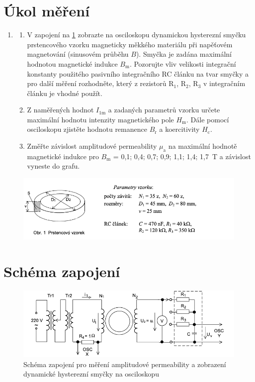 \documentclass[a4paper,12pt]{article}   %
\newcommand{\tsub}[1]{$_\textrm{#1}$}
\begin{document}
\section{Úkol měření}
\label{chap:ukol}
\begin{enumerate}
    \item 
    \begin{enumerate}[label=\alph*)]
        \item V zapojení na \ref{fig:schema} zobrazte na osciloskopu dynamickou hysterezní smyčku prstencového vzorku magneticky měkkého materiálu při napěťovém magnetování (sinusovém průběhu $B$). Smyčka je zadána maximální hodnotou magnetické indukce $B_\text{m}$. Pozorujte vliv velikosti integrační konstanty použitého pasivního integračního RC článku na tvar smyčky a pro další měření rozhodněte, který z rezistorů R\tsub{1}, R\tsub{2}, R\tsub{3} v integračním článku je vhodné použít.
        \item Z naměřených hodnot $I_\text{1m}$ a zadaných parametrů vzorku určete maximální hodnotu intenzity magnetického pole $H_\text{m}$. Dále pomocí osciloskopu zjistěte hodnotu remanence $B_\text{r}$ a koercitivity $H_\text{c}$.
        \item Změřte závislost amplitudové permeability $\mu_\text{a}$ na maximální hodnotě magnetické indukce pro $B_\text{m}$ = 0,1; 0,4; 0,7; 0,9; 1,1; 1,4; 1,7~T a závislost vyneste do grafu.
    \end{enumerate}
\end{enumerate}

\begin{figure}
  \centering
  \includegraphics[width=\textwidth]{prstenec.png}
\end{figure}


\section{Schéma zapojení}
\label{chap:schema_zapojeni}
\begin{figure}[h!]
  \centering
  \includegraphics[width=\textwidth]{schema.png}
  \caption{Schéma zapojení pro měření amplitudové permeability a zobrazení dynamické hysterezní smyčky na osciloskopu}
  \label{fig:schema}
\end{figure}
\end{document}
